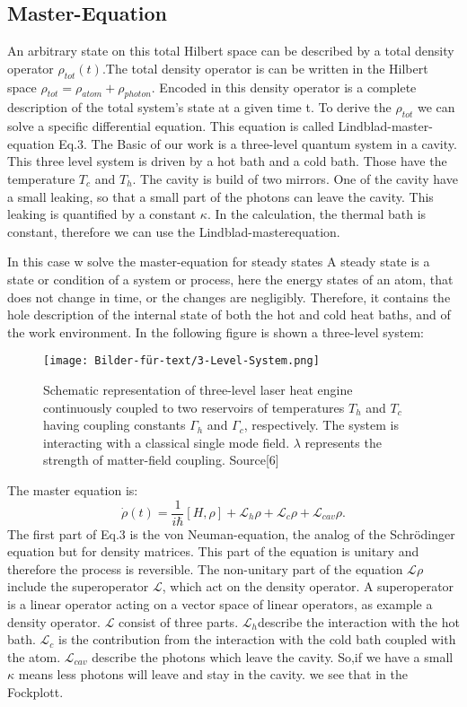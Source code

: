 \documentclass[12pt,a4paper]{article}
\begin{document}
\subsection{Master-Equation} 
An arbitrary state on this total
Hilbert space can be described by a total density operator $\rho_{tot}(t)$.The total density operator is  can be written in the Hilbert space $ \rho_ {tot}= \rho_{atom}+\rho_{photon}$.  Encoded in this density
operator is a complete description of the total system's state at a given time t. To derive the $\rho_{tot}$ we can solve a specific differential equation. This equation is called Lindblad-master-equation Eq.3. 
The Basic of our work is a three-level quantum system in a cavity. This three level system is driven by a hot bath and a cold bath. Those have the temperature $T_c$ and $T_h$. The cavity is build of two mirrors. One of the cavity have a small leaking, so that a small part of the photons can leave the cavity. This leaking is quantified by a constant $\kappa$.
In the calculation, the thermal bath is constant, therefore 
we can use the Lindblad-masterequation. 

In this case w solve the master-equation for steady states
A steady state is a state or condition of a system or process, here the energy states of an atom, that does not change in time, or the changes are negligibly.
Therefore, it contains the hole description of the internal state of both the hot and cold heat baths,
and of the work environment.
In the following figure is shown a three-level system:
\newpage
\begin{figure}
\texttt{[image: Bilder-für-text/3-Level-System.png]}
\caption{Schematic representation of three-level laser heat engine
continuously coupled to two reservoirs of temperatures $T_h$ and
$T_c$ having coupling constants $\Gamma_h$ and $\Gamma_c$, respectively. The
system is interacting with a classical single mode field. $\lambda$
represents the strength of matter-field coupling. Source[6]}
\end{figure}

The master equation is:
\begin{equation}
\dot{\rho}(t)=\frac{1}{i \hbar}[H,\rho]+ \mathcal{L}_{h}\rho+ \mathcal{L}_{c}\rho+ \mathcal{L}_{cav}\rho.
\end{equation}
The first part of Eq.3 is the von Neuman-equation,  the analog of the Schrödinger equation but for density matrices. This part of the equation is unitary and therefore the process is reversible.
The non-unitary part of the equation $\mathcal{L}\rho$ include the superoperator $\mathcal{L}$, which act on the density operator.  A superoperator is a linear operator acting on a vector space of linear operators, as example a density operator.
$\mathcal{L}$ consist of three parts. $\mathcal{L}_h$describe the interaction with the hot bath.
$\mathcal{L}_c$ is the contribution from the interaction with the cold bath coupled with the atom.
$\mathcal{L}_{cav}$ describe the photons which leave the cavity. So,if we have a small $\kappa$ means less photons will leave and stay in the cavity. we see that in the Fockplott.
\end{document}

